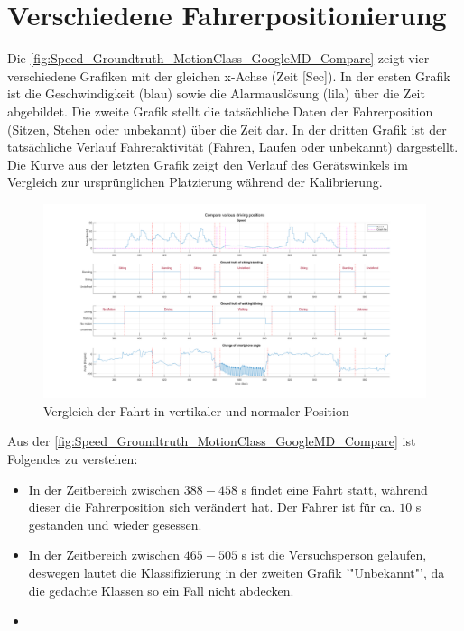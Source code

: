 \section{Verschiedene Fahrerpositionierung}
Die \autoref{fig:Speed_Groundtruth_MotionClass_GoogleMD_Compare} zeigt vier verschiedene Grafiken mit der gleichen x-Achse (Zeit [Sec]).
In der ersten Grafik ist die Geschwindigkeit (blau) sowie die Alarmauslösung (lila) über die Zeit abgebildet.
Die zweite Grafik stellt die tatsächliche Daten der Fahrerposition (Sitzen, Stehen oder unbekannt) über die Zeit dar.
In der dritten Grafik ist der tatsächliche Verlauf Fahreraktivität (Fahren, Laufen oder unbekannt) dargestellt.
Die Kurve aus der letzten Grafik zeigt den Verlauf des Gerätswinkels im Vergleich zur ursprünglichen Platzierung während der Kalibrierung. 

\begin{figure}[H]
	\centering
	\includegraphics[width=\linewidth]{Bilder/Speed_Groundtruth_WalkStand_Compare.png}
	\caption{Vergleich der Fahrt in vertikaler und normaler Position} %
	\label{fig:Speed_Groundtruth_WalkStand_Compare}
\end{figure}


Aus der \autoref{fig:Speed_Groundtruth_MotionClass_GoogleMD_Compare} ist Folgendes zu verstehen:

\begin{itemize}
	\item In der Zeitbereich zwischen $388 - 458$ s findet eine Fahrt statt, während dieser die Fahrerposition sich verändert hat. Der Fahrer ist für ca. $10$ s gestanden und wieder gesessen.
	\item In der Zeitbereich zwischen $465 - 505$ s ist die Versuchsperson gelaufen, deswegen lautet die Klassifizierung in der zweiten Grafik '"Unbekannt"', da die gedachte Klassen so ein Fall nicht abdecken.
	\item  
\end{itemize}

